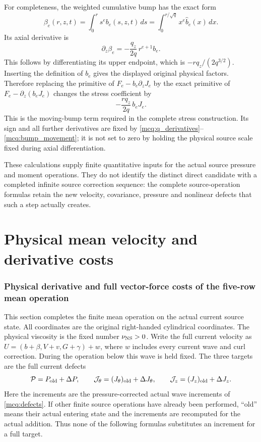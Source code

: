 \documentclass[11pt]{article}
\begin{document}
For completeness, the weighted cumulative bump has the exact form
\[
 \beta_e(r,z,t)=\int_0^rs^eb_e(s,z,t)\,ds
              =\int_0^{r/\sqrt q}x^e\widehat b_e(x)\,dx .
\]
Its axial derivative is
\begin{equation}\label{mcq:bump_movement}
 \partial_z\beta_e
 =-\frac{q_z}{2q}\,r^{e+1}b_e .
\end{equation}
This follows by differentiating its upper endpoint, which is
\(-rq_z/(2q^{3/2})\). Inserting the definition of \(b_e\) gives
the displayed original physical factors. Therefore replacing the
primitive of \(F_e-b_e\partial_zJ_e\) by the exact primitive of
\(F_e-\partial_z(b_eJ_e)\) changes the stress coefficient by
\[
 -\frac{rq_z}{2q}\,b_eJ_e .
\]
This is the moving-bump term required in the complete stress construction.
Its sign and all further derivatives are fixed by
\eqref{mcq:q_derivatives}--\eqref{mcq:bump_movement}; it is not set to zero
by holding the physical source scale fixed during axial differentiation.

These calculations supply finite quantitative inputs for the actual
source pressure and moment operations. They do not identify the
distinct direct candidate with a completed infinite source correction
sequence: the complete source-operation formulas retain the new
velocity, covariance, pressure and nonlinear defects that such a step
actually creates.

\clearpage\part{Physical mean velocity and derivative costs}
\section{Physical derivative and full vector-force costs of the five-row mean operation}
\label{mcmean:section}

This section completes the finite mean operation on the actual current
source state. All coordinates are the original right-handed cylindrical
coordinates. The physical viscosity is the fixed number
\(\nu_{\rm NS}>0\). Write the full current velocity as
\(U=(b+\beta,V+v,G+\gamma)+w\), where \(w\) includes every current
wave and curl correction. During the operation below this wave is held
fixed. The three targets are the full current defects
\begin{equation}\label{mcmean:full_targets}
 \mathcal P=P_{\rm old}+\Delta P,\qquad
 \mathcal J_\theta=(J_\theta)_{\rm old}+\Delta J_\theta,\qquad
 \mathcal J_z=(J_z)_{\rm old}+\Delta J_z.
\end{equation}
Here the increments are the pressure-corrected actual wave increments
of \eqref{mcq:defects}. If other finite source operations have already
been performed, ``old'' means their actual entering state and the
increments are recomputed for the actual addition. Thus none of the
following formulas substitutes an increment for a full target.
\end{document}
